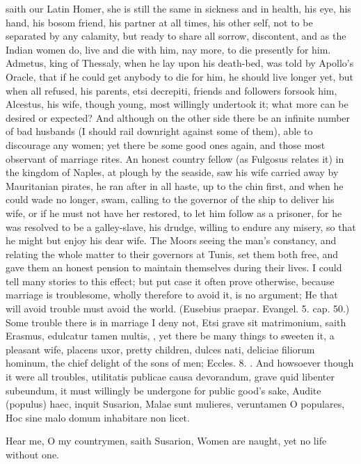saith our Latin Homer, she is still the same in sickness and in health,
his eye, his hand, his bosom friend, his partner at all times, his
other self, not to be separated by any calamity, but ready to share all
sorrow, discontent, and as the Indian women do, live and die with him,
nay more, to die presently for him. Admetus, king of Thessaly, when he
lay upon his death-bed, was told by Apollo's Oracle, that if he could
get anybody to die for him, he should live longer yet, but when all
refused, his parents, etsi decrepiti, friends and followers forsook
him, Alcestus, his wife, though young, most willingly undertook it;
what more can be desired or expected? And although on the other side
there be an infinite number of bad husbands (I should rail downright
against some of them), able to discourage any women; yet there be some
good ones again, and those most observant of marriage rites. An honest
country fellow (as Fulgosus relates it) in the kingdom of Naples,
at plough by the seaside, saw his wife carried away by
Mauritanian pirates, he ran after in all haste, up to the chin first,
and when he could wade no longer, swam, calling to the governor of the
ship to deliver his wife, or if he must not have her restored, to let
him follow as a prisoner, for he was resolved to be a galley-slave, his
drudge, willing to endure any misery, so that he might but enjoy his
dear wife. The Moors seeing the man's constancy, and relating the whole
matter to their governors at Tunis, set them both free, and gave them
an honest pension to maintain themselves during their lives. I could
tell many stories to this effect; but put case it often prove
otherwise, because marriage is troublesome, wholly therefore to avoid
it, is no argument; He that will avoid trouble must avoid the
world. (Eusebius praepar. Evangel. 5. cap. 50.) Some trouble there is
in marriage I deny not, Etsi grave sit matrimonium, saith Erasmus,
edulcatur tamen multis, \etc{}, yet there be many things to sweeten
it, a pleasant wife, placens uxor, pretty children, dulces nati,
deliciae filiorum hominum, the chief delight of the sons of men;
Eccles.  8. \etc{}. And howsoever though it were all troubles,
utilitatis publicae causa devorandum, grave quid libenter
subeundum, it must willingly be undergone for public good's sake,
Audite (populus) haec, inquit Susarion,
Malae sunt mulieres, veruntamen O populares,
Hoc sine malo domum inhabitare non licet.

Hear me, O my countrymen, saith Susarion,
Women are naught, yet no life without one.

